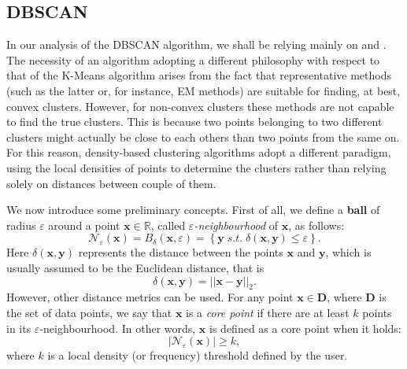 \documentclass[a4paper]{article}
\begin{document}
	\subsection{DBSCAN}
	In our analysis of the DBSCAN algorithm, we shall be relying mainly on \cite{Ester96adensity-based} and \cite{zaki2014dataminingbook}. The necessity of an algorithm adopting a different philosophy with respect to that of the K-Means algorithm arises from the fact that representative methods (such as the latter or, for instance, EM methods) are suitable for finding, at best, convex clusters.
	However, for non-convex clusters these methods are not capable to find the true clusters. This is because two points belonging to two different clusters might actually be close to each others than two points from the same on.
	For this reason, density-based clustering algorithms adopt a different paradigm, using the local densities of points to determine the clusters rather than relying solely on distances between couple of them.

	We now introduce some preliminary concepts. First of all, we define a \textbf{ball} of radius $\varepsilon$ around a point $\boldsymbol{x} \in \mathbb{R}$, called \textit{$\varepsilon$-neighbourhood} of $\boldsymbol{x}$, as follows:
	\begin{equation*}
	\mathcal{N}_{\varepsilon} (\boldsymbol{x}) = B_{\delta}\left( \boldsymbol{x}, \varepsilon \right) = \left\{ \boldsymbol{y} \; s.t. \; \delta \left( \boldsymbol{x}, \boldsymbol{y} \right) \leq \varepsilon \right\}.
	\end{equation*}
	Here $\delta \left( \boldsymbol{x}, \boldsymbol{y} \right)$ represents the distance between the points $\boldsymbol{x}$ and $\boldsymbol{y}$, which is usually assumed to be the Euclidean distance, that is
	\begin{equation*}
	\delta(\boldsymbol{x}, \boldsymbol{y}) = || \boldsymbol{x} - \boldsymbol{y} ||_{2}.
	\end{equation*}
	However, other distance metrics can be used.
	For any point $\boldsymbol{x} \in \boldsymbol{D}$, where $\boldsymbol{D}$ is the set of data points, we say that $\boldsymbol{x}$ is a \textit{core point} if there are at least $k$ points in its $\varepsilon$-neighbourhood.
	In other words, $\boldsymbol{x}$ is defined as a core point when it holds:
	\begin{equation*}
	| \mathcal{N}_{\varepsilon}(\boldsymbol{x})| \geq k,
	\end{equation*}
	where $k$ is a local density (or frequency) threshold defined by the user.
\end{document}
